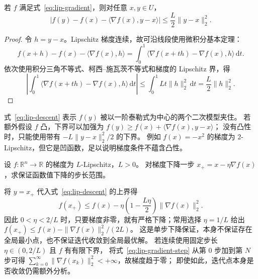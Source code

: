 \documentclass[UTF8,12pt,a4paper,fontset=fandol]{ctexart}
\begin{document}
\begin{theorem}[一阶近似的二次余项界]\label{thm:lip-descent}
若 $f$ 满足式~\eqref{eq:lip-gradient}，则对任意 $x,y\in U$，
\begin{equation}\label{eq:lip-descent}
  |f(y)-f(x)-\langle\nabla f(x),y-x\rangle|
  \le\frac L2\|y-x\|_2^2.
\end{equation}
\end{theorem}
\begin{proof}
令 $h=y-x$。Lipschitz 梯度连续，故可沿线段使用微积分基本定理：
\[
  f(x+h)-f(x)-\langle\nabla f(x),h\rangle
  =\int_0^1\langle\nabla f(x+th)-\nabla f(x),h\rangle\,\mathrm dt.
\]
依次使用积分三角不等式、柯西--施瓦茨不等式和梯度的 Lipschitz 界，得
\[
  \left|\int_0^1\langle\nabla f(x+th)-\nabla f(x),h\rangle\,\mathrm dt\right|
  \le\int_0^1Lt\|h\|_2^2\,\mathrm dt=\frac L2\|h\|_2^2.
\]
\end{proof}

式~\eqref{eq:lip-descent} 表示 $f(y)$ 被以一阶泰勒式为中心的两个二次模型夹住。
若额外假设 $f$ 凸，下界可以加强为 $f(y)\ge f(x)+\langle\nabla f(x),y-x\rangle$；
没有凸性时，只能使用带有 $-L\|y-x\|_2^2/2$ 的下界。
例如 $f(x)=-x^2$ 的梯度为 $2$-Lipschitz，但它是凹函数，足以说明梯度条件不蕴含凸性。

\begin{example}\label{ex:lip-gradient-step}
设 $f:\mathbb R^n\to\mathbb R$ 的梯度为 $L$-Lipschitz，$L>0$。
对梯度下降一步 $x_+=x-\eta\nabla f(x)$，求保证函数值下降的步长范围。
\end{example}
\begin{solve}
将 $y=x_+$ 代入式~\eqref{eq:lip-descent} 的上界得
\begin{equation}\label{eq:lip-gradient-step}
  f(x_+)\le f(x)-\eta\left(1-\frac{L\eta}{2}\right)\|\nabla f(x)\|_2^2.
\end{equation}
因此 $0<\eta<2/L$ 时，只要梯度非零，就有严格下降；常用选择 $\eta=1/L$ 给出
$f(x_+)\le f(x)-\|\nabla f(x)\|_2^2/(2L)$。
这是单步下降保证，本身不保证存在全局最小点，也不保证迭代收敛到全局最优解。
若连续使用固定步长 $\eta\in(0,2/L)$ 且 $f$ 有有限下界，
将式~\eqref{eq:lip-gradient-step} 从第 $0$ 步加到第 $N$ 步可得
$\sum_{k=0}^{\infty}\|\nabla f(x_k)\|_2^2<+\infty$，故梯度趋于零；
即使如此，迭代点本身是否收敛仍需额外分析。
\end{solve}
\end{document}
